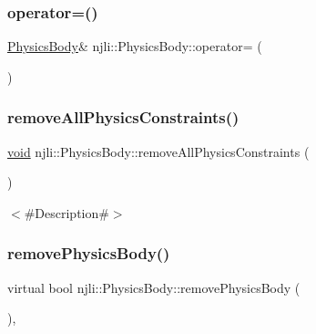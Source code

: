 \subsubsection{\texorpdfstring{operator=()}{operator=()}}
{\footnotesize\ttfamily \mbox{\hyperlink{classnjli_1_1_physics_body}{Physics\+Body}}\& njli\+::\+Physics\+Body\+::operator= (\begin{DoxyParamCaption}\item[{const \mbox{\hyperlink{classnjli_1_1_physics_body}{Physics\+Body}} \&}]{ }\end{DoxyParamCaption})}

\mbox{\label{classnjli_1_1_physics_body_ae4a8cca611e33c624b287613eac4d72c}} 
\subsubsection{\texorpdfstring{remove\+All\+Physics\+Constraints()}{removeAllPhysicsConstraints()}}
{\footnotesize\ttfamily \mbox{\hyperlink{_thread_8h_af1e856da2e658414cb2456cb6f7ebc66}{void}} njli\+::\+Physics\+Body\+::remove\+All\+Physics\+Constraints (\begin{DoxyParamCaption}{ }\end{DoxyParamCaption})\hspace{0.3cm}{\ttfamily [protected]}}

$<$\#\+Description\#$>$ \mbox{\label{classnjli_1_1_physics_body_a832ed4f79a2b52b334d63d094364f86a}} 
\subsubsection{\texorpdfstring{remove\+Physics\+Body()}{removePhysicsBody()}}
{\footnotesize\ttfamily virtual bool njli\+::\+Physics\+Body\+::remove\+Physics\+Body (\begin{DoxyParamCaption}{ }\end{DoxyParamCaption})\hspace{0.3cm}{\ttfamily [protected]}, {}}



